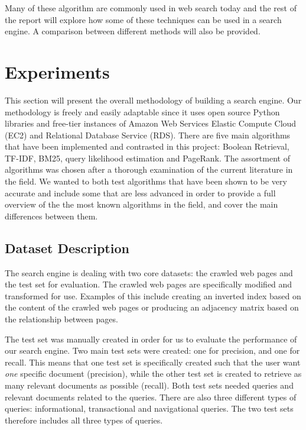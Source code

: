 Many of these algorithm are commonly used in web search today and the rest of the report will explore how some of these techniques can be used in a search engine. A comparison between different methods will also be provided.




\section{Experiments} %
\label{sec:experiment}

This section will present the overall methodology of building a search engine. Our methodology is freely and easily adaptable since it uses open source Python libraries and free-tier instances of Amazon Web Services Elastic Compute Cloud (EC2) and Relational Database Service (RDS). There are five main algorithms that have been implemented and contrasted in this project: Boolean Retrieval, TF-IDF, BM25, query likelihood estimation and PageRank. The assortment of algorithms was chosen after a thorough examination of the current literature in the field. We wanted to both test algorithms that have been shown to be very accurate and include some that are less advanced in order to provide a full overview of the the most known algorithms in the field, and cover the main differences between them. 

\subsection{Dataset Description} %
\label{sub:dataset_description}

The search engine is dealing with two core datasets: the crawled web pages and the test set for evaluation. The crawled web pages are specifically modified and transformed for use. Examples of this include creating an inverted index based on the content of the crawled web pages or producing an adjacency matrix based on the relationship between pages.

The test set was manually created in order for us to evaluate the performance of our search engine. Two main test sets were created: one for precision, and one for recall. This means that one test set is specifically created such that the user want \emph{one} specific document (precision), while the other test set is created to retrieve as many relevant documents as possible (recall). Both test sets needed queries and relevant documents related to the queries. There are also three different types of queries: informational, transactional and navigational queries. The two test sets therefore includes all three types of queries.

